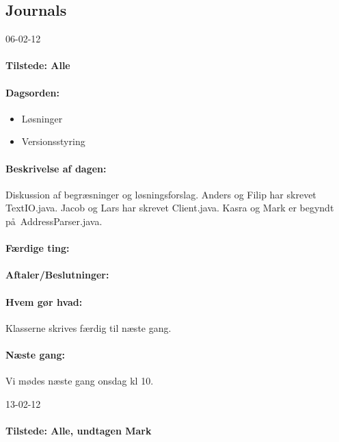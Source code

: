 \documentclass[a4paper,10pt,titlepage]{article}
\begin{document}
	\subsection{Journals}		
		\begin{center}
		06-02-12
		\end{center}
				\paragraph{Tilstede: Alle}
				\paragraph{Dagsorden:}
				\begin{itemize}
					\item L\o sninger
					\item Versionsstyring
				\end{itemize}	
			\paragraph{Beskrivelse af dagen:}
			Diskussion af begr\ae sninger og l\o sningsforslag. Anders og Filip har skrevet TextIO.java. Jacob og Lars har skrevet Client.java. Kasra og Mark er begyndt p\aa \ AddressParser.java.
			\paragraph{F\ae rdige ting:}
			
			\paragraph{Aftaler/Beslutninger:}
			
			\paragraph{Hvem g\o r hvad:}
			Klasserne skrives f\ae rdig til n\ae ste gang.\
			
			\paragraph{N\ae ste gang:}
			Vi m\o des n\ae ste gang onsdag kl 10.\mbox{}\\
			
			\begin{center}
		13-02-12
		\end{center}
				\paragraph{Tilstede: Alle, undtagen Mark}
\end{document}
